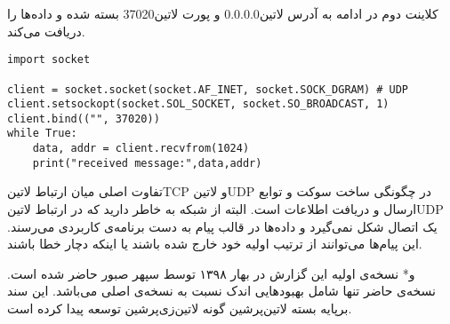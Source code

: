 \documentclass[]{article}
\begin{document}
  کلاینت دوم در ادامه به آدرس ‌لاتین{0.0.0.0} و پورت ‌لاتین{37020} بسته شده و داده‌ها را دریافت می‌کند.

  \begin{latin}
  \begin{verbatim}
import socket

client = socket.socket(socket.AF_INET, socket.SOCK_DGRAM) # UDP
client.setsockopt(socket.SOL_SOCKET, socket.SO_BROADCAST, 1)
client.bind(("", 37020))
while True:
    data, addr = client.recvfrom(1024)
    print("received message:",data,addr)
  \end{verbatim}
  \end{latin}

  تفاوت اصلی میان ارتباط ‌لاتین{TCP} و ‌لاتین{UDP} در چگونگی ساخت سوکت و توابع ارسال و دریافت اطلاعات است.
  البته از شبکه به خاطر دارید که در ارتباط ‌لاتین{UDP} یک اتصال شکل نمی‌گیرد
  و داده‌ها در قالب پیام به دست برنامه‌ی کاربردی می‌رسند.
  این پیام‌ها می‌توانند از ترتیب اولیه خود خارج شده باشند یا اینکه دچار خطا باشند.

  ‌و*{}
  نسخه‌ی اولیه این گزارش در بهار ۱۳۹۸ توسط سپهر صبور حاضر شده است. نسخه‌ی حاضر تنها شامل بهبودهایی اندک نسبت به نسخه‌ی اصلی می‌باشد.
  این سند برپایه بسته ‌لاتین{‌پرشین} گونه ‌لاتین{‌زی‌پرشین} توسعه پیدا کرده است.
\end{document}
